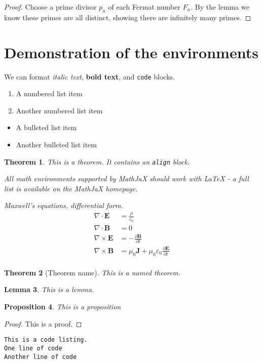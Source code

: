\documentclass[12pt]{amsart}
\theoremstyle{plain}%
\newtheorem{thm}{Theorem}[section]
\newtheorem{lem}[thm]{Lemma}
\newtheorem{prop}[thm]{Proposition}
\begin{document}
\begin{proof}
    Choose a prime divisor $p_n$ of each Fermat number $F_n$.  By the lemma we know these primes are all distinct, showing there are infinitely many primes.
\end{proof}

\section{Demonstration of the environments}

We can format \emph{italic text}, \textbf{bold text}, and \texttt{code} blocks.

\begin{enumerate}
    \item A numbered list item
    \item Another numbered list item
\end{enumerate}

\begin{itemize}
    \item A bulleted list item
    \item Another bulleted list item
\end{itemize}

\begin{thm}
    This is a theorem.  It contains an \texttt{align} block.  
    
    All math environments supported by MathJaX should work with LaTeX - a full list is available on the MathJaX homepage.
    
    Maxwell's equations, differential form.
    \begin{align*}
        \nabla \cdot \mathbf{E} &= \frac {\rho} {\varepsilon_0} \\
        \nabla \cdot \mathbf{B} &= 0 \\
        \nabla \times \mathbf{E} &= -\frac{\partial \mathbf{B}} {\partial t} \\
        \nabla \times \mathbf{B} &= \mu_0 \mathbf{J} + \mu_0 \varepsilon_0 \frac{\partial \mathbf{E}} {\partial t} \\
    \end{align*}
\end{thm}

\begin{thm}[Theorem name]
    This is a named theorem.
\end{thm}

\begin{lem}
    This is a lemma.
\end{lem}

\begin{prop}
    This is a proposition
\end{prop}

\begin{proof}
    This is a proof.
\end{proof}

\begin{lstlisting}
This is a code listing.
One line of code
Another line of code
\end{lstlisting}
\end{document}
